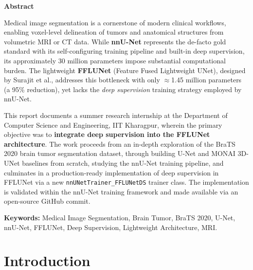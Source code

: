 \documentclass[12pt,a4paper]{report}
\begin{document}
\newpage
\thispagestyle{plain}
\begin{center}
  {\Large \bfseries Abstract}
\end{center}
\vspace{0.5cm}

Medical image segmentation is a cornerstone of modern clinical workflows, enabling voxel-level delineation of tumors and anatomical structures from volumetric MRI or CT data. While \textbf{nnU-Net} represents the de-facto gold standard with its self-configuring training pipeline and built-in deep supervision, its approximately 30 million parameters impose substantial computational burden. The lightweight \textbf{FFLUNet} (Feature Fused Lightweight UNet), designed by Surajit et al., addresses this bottleneck with only $\approx$1.45 million parameters (a 95\% reduction), yet lacks the \textit{deep supervision} training strategy employed by nnU-Net.

This report documents a summer research internship at the Department of Computer Science and Engineering, IIT Kharagpur, wherein the primary objective was to \textbf{integrate deep supervision into the FFLUNet architecture}. The work proceeds from an in-depth exploration of the BraTS 2020 brain tumor segmentation dataset, through building U-Net and MONAI 3D-UNet baselines from scratch, studying the nnU-Net training pipeline, and culminates in a production-ready implementation of deep supervision in FFLUNet via a new \texttt{nnUNetTrainer\_FFLUNetDS} trainer class. The implementation is validated within the nnU-Net training framework and made available via an open-source GitHub commit.

\vspace{1cm}
\noindent\textbf{Keywords:} Medical Image Segmentation, Brain Tumor, BraTS 2020, U-Net, nnU-Net, FFLUNet, Deep Supervision, Lightweight Architecture, MRI.

\newpage
\tableofcontents

\newpage
\listoffigures

\newpage
\listoftables

\chapter{Introduction}
\end{document}
